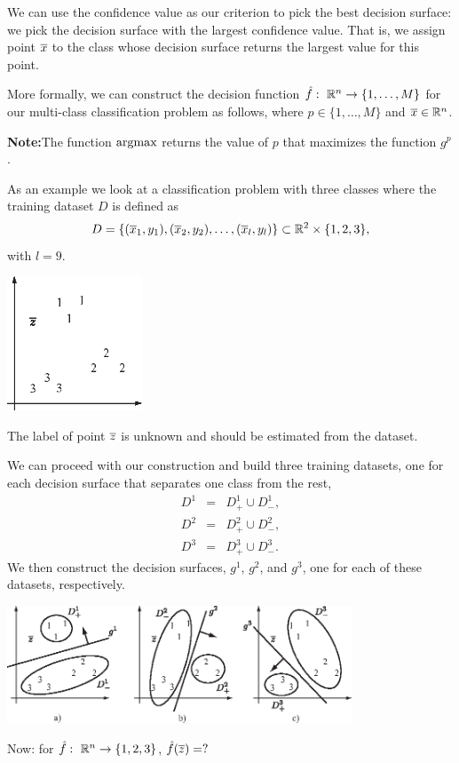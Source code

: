 \documentclass[a4paper,blends,pdf,colorBG,slideColor]{prosper}
\begin{document}
\es

We can use the confidence value as our criterion to pick the best decision surface: we pick the
decision surface with the largest confidence value.  That is, we assign point $\overline{x}$
to the class whose decision surface returns the largest value for this point.  

More formally, we can construct the decision function $\hat{f}\,\colon\; \mathbb{R}^{n} \rightarrow \{1,\ldots,M\}$ 
for our multi-class
classification problem as follows,
\fframe{
\[
\model{f}(\ol{x}) = \argmax_k g^p(\ol{x}),
\]}
where $p \in \{1,\ldots,M\}$ and $\overline{x}\in \mathbb{R}^{n}$.  

{\bf Note:}The function $\argmax$ returns the value of $p$ that 
maximizes the function $g^p$.

\es

As an example we look at a classification problem with three classes where
the training dataset $D$ is defined as
\begin{equation*}
D = \{(\overline{x}_1,y_1), (\overline{x}_2,y_2),\ldots,(\overline{x}_l,y_l)\} \subset \mathbb{R}^{2} \times \{1,2,3\},
\end{equation*}
with $l = 9$.

\begin{center}
\includegraphics[height=40mm]{figures/fig11-01.eps}
\end{center}
The label of point $\overline{z}$ is unknown and should be estimated from the dataset.
\es

{\small
We can proceed with our construction and build three training datasets, one
for each decision surface that separates one class from the rest,
\begin{eqnarray}
D^1 &=& D_{+}^1 \cup D_{-}^1, \nonumber \\
D^2 &=& D_{+}^2 \cup D_{-}^2, \nonumber \\
D^3 &=& D_{+}^3 \cup D_{-}^3. \nonumber
\end{eqnarray}
We then construct the decision surfaces, $g^1$, $g^2$, and $g^3$, one for each of 
these datasets, respectively.
\begin{center}
\includegraphics[height=35mm]{figures/fig11-02.eps}
\end{center}
Now: for $\hat{f}\,\colon\; \mathbb{R}^{n} \rightarrow \{1,2,3\}$, $\hat{f}(\overline{z}) = ?$
}
\es
\end{document}
